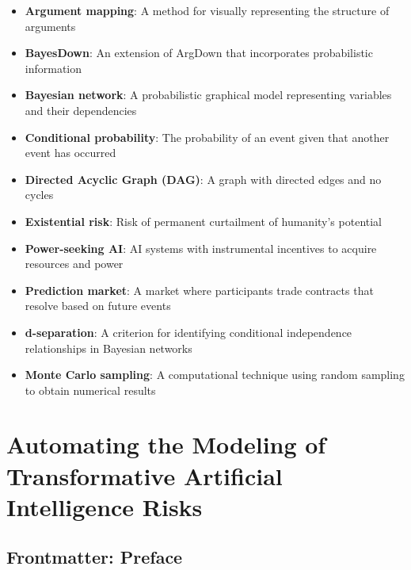 \documentclass[
  11pt,
  letterpaper,
  openany]{book}
\providecommand{\tightlist}{%
  \setlength{\itemsep}{0pt}\setlength{\parskip}{0pt}}
\begin{document}
\begin{itemize}
\tightlist
\item
  \textbf{Argument mapping}: A method for visually representing the
  structure of arguments\\
\item
  \textbf{BayesDown}: An extension of ArgDown that incorporates
  probabilistic information\\
\item
  \textbf{Bayesian network}: A probabilistic graphical model
  representing variables and their dependencies\\
\item
  \textbf{Conditional probability}: The probability of an event given
  that another event has occurred\\
\item
  \textbf{Directed Acyclic Graph (DAG)}: A graph with directed edges and
  no cycles\\
\item
  \textbf{Existential risk}: Risk of permanent curtailment of humanity's
  potential\\
\item
  \textbf{Power-seeking AI}: AI systems with instrumental incentives to
  acquire resources and power\\
\item
  \textbf{Prediction market}: A market where participants trade
  contracts that resolve based on future events\\
\item
  \textbf{d-separation}: A criterion for identifying conditional
  independence relationships in Bayesian networks\\
\item
  \textbf{Monte Carlo sampling}: A computational technique using random
  sampling to obtain numerical results
\end{itemize}


\chapter{Automating the Modeling of Transformative Artificial
Intelligence
Risks}\label{automating-the-modeling-of-transformative-artificial-intelligence-risks}

\section{Frontmatter: Preface}\label{frontmatter-preface}
\end{document}
